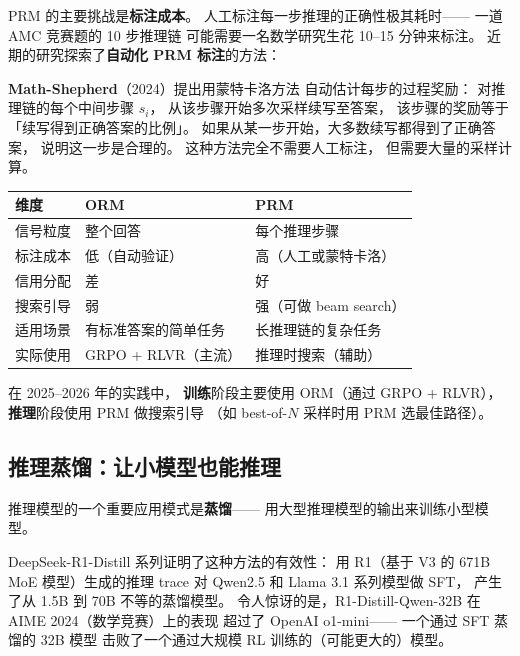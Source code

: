 PRM 的主要挑战是\textbf{标注成本}。
人工标注每一步推理的正确性极其耗时——
一道 AMC 竞赛题的 10 步推理链
可能需要一名数学研究生花 10--15 分钟来标注。
近期的研究探索了\textbf{自动化 PRM 标注}的方法：

\textbf{Math-Shepherd}（2024）提出用蒙特卡洛方法
自动估计每步的过程奖励：
对推理链的每个中间步骤 $s_i$，
从该步骤开始多次采样续写至答案，
该步骤的奖励等于「续写得到正确答案的比例」。
如果从某一步开始，大多数续写都得到了正确答案，
说明这一步是合理的。
这种方法完全不需要人工标注，
但需要大量的采样计算。


\begin{corebox}
\begin{tabularx}{\linewidth}{l X X}
\toprule
\textbf{维度} & \textbf{ORM} & \textbf{PRM} \\
\midrule
信号粒度 & 整个回答 & 每个推理步骤 \\
标注成本 & 低（自动验证） & 高（人工或蒙特卡洛） \\
信用分配 & 差 & 好 \\
搜索引导 & 弱 & 强（可做 beam search） \\
适用场景 & 有标准答案的简单任务 & 长推理链的复杂任务 \\
实际使用 & GRPO + RLVR（主流） & 推理时搜索（辅助） \\
\bottomrule
\end{tabularx}
在 2025--2026 年的实践中，
\textbf{训练}阶段主要使用 ORM（通过 GRPO + RLVR），
\textbf{推理}阶段使用 PRM 做搜索引导
（如 best-of-$N$ 采样时用 PRM 选最佳路径）。
\end{corebox}

\subsection{推理蒸馏：让小模型也能推理}

推理模型的一个重要应用模式是\textbf{蒸馏}——
用大型推理模型的输出来训练小型模型。

DeepSeek-R1-Distill 系列证明了这种方法的有效性：
用 R1（基于 V3 的 671B MoE 模型）生成的推理 trace
对 Qwen2.5 和 Llama 3.1 系列模型做 SFT，
产生了从 1.5B 到 70B 不等的蒸馏模型。
令人惊讶的是，R1-Distill-Qwen-32B
在 AIME 2024（数学竞赛）上的表现
超过了 OpenAI o1-mini——
一个通过 SFT 蒸馏的 32B 模型
击败了一个通过大规模 RL 训练的（可能更大的）模型。

